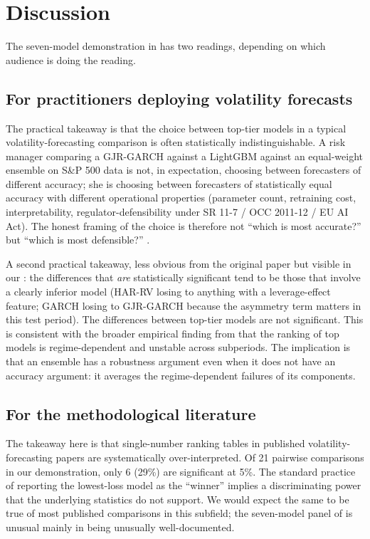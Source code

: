 \section{Discussion}\label{sec:discussion}

The seven-model demonstration in  has two readings, depending on which audience is doing the reading.

\subsection{For practitioners deploying volatility forecasts}

The practical takeaway is that the choice between top-tier models in a typical volatility-forecasting comparison is often statistically indistinguishable. A risk manager comparing a GJR-GARCH against a LightGBM against an equal-weight ensemble on S\&P 500 data is not, in expectation, choosing between forecasters of different accuracy; she is choosing between forecasters of statistically equal accuracy with different operational properties (parameter count, retraining cost, interpretability, regulator-defensibility under SR 11-7 / OCC 2011-12 / EU AI Act). The honest framing of the choice is therefore not ``which is most accurate?'' but ``which is most defensible?'' \citep{FedSR117, OCC2011, EUAIAct}.

A second practical takeaway, less obvious from the original paper but visible in our : the differences that \emph{are} statistically significant tend to be those that involve a clearly inferior model (HAR-RV losing to anything with a leverage-effect feature; GARCH losing to GJR-GARCH because the asymmetry term matters in this test period). The differences between top-tier models are not significant. This is consistent with the broader empirical finding from \citet{KhanVol2026} that the ranking of top models is regime-dependent and unstable across subperiods. The implication is that an ensemble has a robustness argument even when it does not have an accuracy argument: it averages the regime-dependent failures of its components.

\subsection{For the methodological literature}

The takeaway here is that single-number ranking tables in published volatility-forecasting papers are systematically over-interpreted. Of 21 pairwise comparisons in our demonstration, only 6 (29\%) are significant at 5\%. The standard practice of reporting the lowest-loss model as the ``winner'' implies a discriminating power that the underlying statistics do not support. We would expect the same to be true of most published comparisons in this subfield; the seven-model panel of \citet{KhanVol2026} is unusual mainly in being unusually well-documented.


